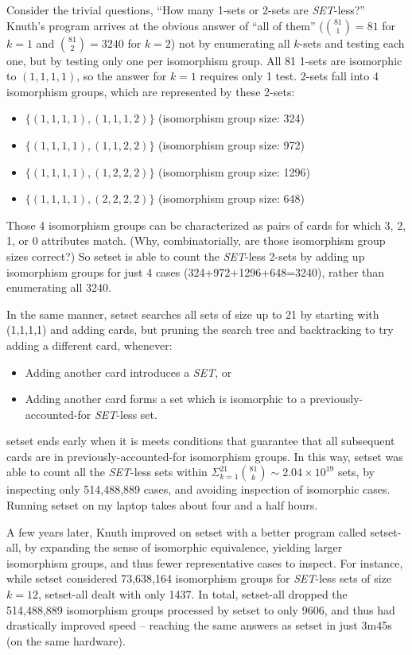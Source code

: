 \documentclass{article}
\theoremstyle{theorem}
\theoremstyle{definition}
\newcommand{\SET}{{\em SET}}
\newcommand{\SETSETb}{{\sc setset }}
\newcommand{\SETSETA}{{\sc setset-all}}
\newcommand{\SETSETAb}{{\sc setset-all }}
\begin{document}
Consider the trivial questions, ``How many 1-sets or 2-sets are \SET-less?''
Knuth's program arrives at the obvious answer of ``all of them''
($\binom{81}{1}=81$ for $k=1$ and $\binom{81}{2}=3240$ for $k=2$) not by
enumerating all $k$-sets and testing each one, but by testing only one per
isomorphism group. All 81 1-sets are isomorphic to ${(1,1,1,1)}$, so the answer
for $k=1$ requires only 1 test. 2-sets fall into 4 isomorphism groups, which are
represented by these 2-sets:
\begin{itemize}
\item $\{(1,1,1,1), (1,1,1,2)\}$ (isomorphism group size: 324)
\item $\{(1,1,1,1), (1,1,2,2)\}$ (isomorphism group size: 972)
\item $\{(1,1,1,1), (1,2,2,2)\}$ (isomorphism group size: 1296)
\item $\{(1,1,1,1), (2,2,2,2)\}$ (isomorphism group size: 648)
\end{itemize}
Those 4 isomorphism groups can be characterized as pairs of cards for which 3,
2, 1, or 0 attributes match. (Why, combinatorially, are those isomorphism group
sizes correct?) So \SETSETb is able to count the \SET-less 2-sets by adding up
isomorphism groups for just 4 cases (324+972+1296+648=3240), rather than
enumerating all 3240.

In the same manner, \SETSETb searches all sets of size up to 21 by starting with
(1,1,1,1) and adding cards, but pruning the search tree and backtracking to try
adding a different card, whenever:
\begin{itemize}
\item Adding another card introduces a \SET, or
\item Adding another card forms a set which is isomorphic to a
  previously-accounted-for \SET-less set.
\end{itemize}
\SETSETb ends early when it is meets conditions that guarantee that all
subsequent cards are in previously-accounted-for isomorphism groups. In this
way, \SETSETb was able to count all the \SET-less sets within
$\Sigma_{k=1}^{21}\binom{81}{k}\sim 2.04\times 10^{19}$ sets, by inspecting only
514,488,889 cases, and avoiding inspection of isomorphic cases. Running \SETSETb
on my laptop takes about four and a half hours.

A few years later, Knuth improved on \SETSETb with a better program called
\SETSETA, by expanding the sense of isomorphic equivalence, yielding larger
isomorphism groups, and thus fewer representative cases to inspect. For
instance, while \SETSETb considered 73,638,164 isomorphism groups for \SET-less
sets of size $k=12$, \SETSETAb dealt with only 1437. In total, \SETSETAb dropped
the 514,488,889 isomorphism groups processed by \SETSETb to only 9606, and thus
had drastically improved speed -- reaching the same answers as \SETSETb in just
3m45s (on the same hardware).
\end{document}
